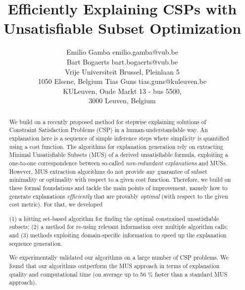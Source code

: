\documentclass[twoside,11pt]{article}
\begin{document}
	

\title{Efficiently Explaining CSPs with Unsatisfiable Subset Optimization}

\author{\name Emilio Gamba \email emilio.gamba@vub.be \\
\name Bart Bogaerts \email bart.bogaerts@vub.be \\
\addr Vrije Universiteit Brussel, Pleinlaan 5\\
1050 Elsene, Belgium
\AND
\name Tias Guns \email tias.guns@kuleuven.be \\
\addr KULeuven, Oude Markt 13 - bus 5500,\\
3000 Leuven, Belgium
}


\maketitle


\begin{abstract}
	We build on a recently proposed method for stepwise explaining solutions of Constraint Satisfaction Problems (CSP) in a human-understandable way. 
	An explanation here is a sequence of simple inference steps where simplicity is quantified using a cost function. 
	The algorithms for explanation generation rely on extracting Minimal Unsatisfiable Subsets (MUS) of a derived unsatisfiable formula, exploiting a one-to-one correspondence between so-called \emph{non-redundant explanations} and MUSs. 
	However, MUS extraction algorithms do not provide any guarantee of subset minimality or optimality with respect to a given cost function. 
	Therefore, we build on these formal foundations and tackle the main points of improvement, namely how to generate explanations \emph{efficiently} that are provably \emph{optimal} (with respect to the given cost metric). 
	For that, we developed \begin{inparaenum}[1)]
	(1) a hitting set-based algorithm for finding the optimal constrained unsatisfiable subsets;
	(2) a method for re-using relevant information over multiple algorithm calls; and
	(3) methods exploiting domain-specific information to speed up the explanation sequence generation.
\end{inparaenum}
	We experimentally validated our algorithms on a large number of CSP problems. We found that our algorithms outperform the MUS approach in terms of explanation quality and computational time (on average up to 56 \% faster than a standard MUS approach).
\end{abstract}
\end{document}
